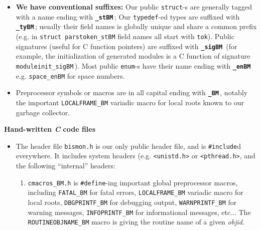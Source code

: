 \begin{appendices}
\begin{itemize}
         \item \textbf{We have conventional suffixes:} Our public
            \texttt{struct}-s are generally tagged
           with a name ending with {\texttt{\textbf{\_stBM}}}\,; Our
           \texttt{typedef}-ed types are suffixed with
                  {\texttt{\textbf{\_tyBM}}}\,; usually their field
                  names is globally unique and share a common prefix
                  (e.g. in \texttt{struct parstoken\_stBM} field names
                  all start with \texttt{tok}). Public signatures
                  (useful for C function pointers) are suffixed with
                  {\texttt{\textbf{\_sigBM}}}\, (for example, the
                  initialization of generated modules is a C function
                  of signature \texttt{moduleinit\_sigBM}\,). Most
                  public \texttt{enum}-s have their name ending with
                  {\texttt{\textbf{\_enBM}}}\,
                  e.g. \texttt{space\_enBM} for space numbers.

              \item Preprocessor symbols or macros are in all capital
                ending with {\texttt{\textbf{\_BM}}}\,, notably the
                important \texttt{LOCALFRAME\_BM} variadic macro for
                local roots known to our garbage collector.
\end{itemize}

{\large \textbf{Hand-written \emph{C} code files}}

\begin{itemize}
  \item The header file \texttt{bismon.h} is our
     only public header file,
    and is \texttt{\#include}d everywhere. It includes system headers
    (e.g. \texttt{<unistd.h>} or \texttt{<pthread.h>}, and the
    following ``internal'' headers:
    \begin{enumerate}
      \item \texttt{cmacros\_BM.h} is \texttt{\#define}-ing important
         global
        preprocessor macros, including \texttt{FATAL\_BM} for fatal
        errors, \texttt{LOCALFRAME\_BM} variadic macro for local
        roots, \texttt{DBGPRINTF\_BM} for debugging output,
        \texttt{WARNPRINTF\_BM} for warning messages,
        \texttt{INFOPRINTF\_BM} for informational messages, etc... The
        \texttt{ROUTINEOBJNAME\_BM} macro
        is giving the routine name of  a given
        \textit{objid}.


\end{enumerate}
\end{itemize}
\end{appendices}
